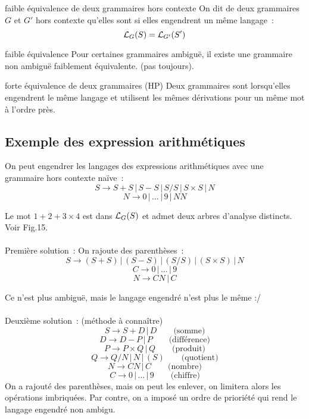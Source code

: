 \begin{adjustwidth}{-3cm}{-3cm}
\begin{definition}{}{faible équivalence de deux grammaires hors contexte}
    On dit de deux grammaires $G$ et $G'$ hors contexte qu'elles sont  si elles engendrent un même langage~:
    $$\mathcal{L}_{G}(S) = \mathcal{L}_{G'}(S')$$
\end{definition}

\begin{remarque}{}{faible équivalence}
    Pour certaines grammaires ambiguë, il existe une grammaire non ambiguë faiblement équivalente. (pas toujours).
\end{remarque}

\begin{definition}{}{forte équivalence de deux grammaires (HP)}
    Deux grammaires sont  lorsqu'elles engendrent le même langage et utilisent les mêmes dérivations pour un même mot à l'ordre près.
\end{definition}

\subsection{Exemple des expression arithmétiques}
On peut engendrer les langages des expressions arithmétiques avec une grammaire hors contexte naïve~:
$$S \rightarrow S + S \,\vert\, S - S \,\vert\, S / S \,\vert\, S \times S \,\vert\, N$$
$$N \rightarrow  0 \,\vert\, \dots \,\vert\, 9 \,\vert\, NN$$

Le mot  $1 + 2 + 3 \times 4$ est dans $\mathcal{L}_{G}(S)$ et admet deux arbres d'analyse distincts. Voir Fig.15.\\\\
Première solution~: On rajoute des parenthèses~:
$$S \rightarrow (S+S) \,\vert\, (S-S) \,\vert\, (S / S) \,\vert\, (S \times S) \,\vert\, N $$
$$C \rightarrow 0 \,\vert\, \dots \,\vert\, 9$$
$$N \rightarrow CN \,\vert\, C$$

Ce n'est plus ambiguë, mais le langage engendré n'est plus le même :/\\\\

Deuxième solution~: (méthode à connaître)
$$S \rightarrow S + D \,\vert\, D \qquad \text{(somme)}$$
$$D \rightarrow D - P \,\vert\, P \qquad \text{(différence)}$$
$$P \rightarrow P \times Q \,\vert\, Q \qquad \text{(produit)}$$
$$Q \rightarrow Q / N \,\vert\, N \,\vert\, (S)\qquad \text{(quotient)}$$
$$N \rightarrow CN \,\vert\, C \qquad \text{(nombre)}$$
$$C \rightarrow 0 \,\vert\, \dots \,\vert\, 9 \qquad \text{(chiffre)}$$
On a rajouté des parenthèses, mais on peut les enlever, on limitera alors les opérations imbriquées. Par contre, on a imposé un ordre de prioriété qui rend le langage engendré non ambigu.


\end{adjustwidth}

